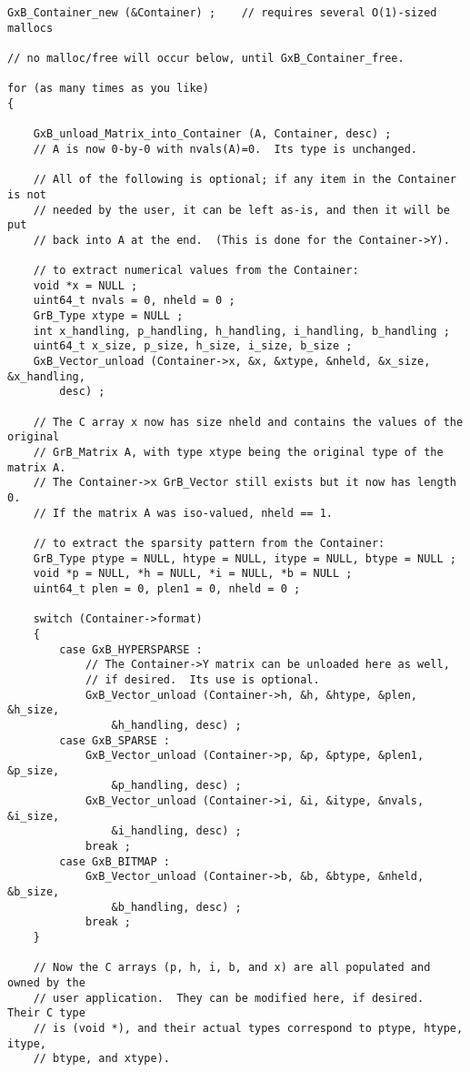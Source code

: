 {\footnotesize
\begin{verbatim}
GxB_Container_new (&Container) ;    // requires several O(1)-sized mallocs

// no malloc/free will occur below, until GxB_Container_free.

for (as many times as you like)
{

    GxB_unload_Matrix_into_Container (A, Container, desc) ;
    // A is now 0-by-0 with nvals(A)=0.  Its type is unchanged.

    // All of the following is optional; if any item in the Container is not
    // needed by the user, it can be left as-is, and then it will be put
    // back into A at the end.  (This is done for the Container->Y).

    // to extract numerical values from the Container:
    void *x = NULL ;
    uint64_t nvals = 0, nheld = 0 ;
    GrB_Type xtype = NULL ;
    int x_handling, p_handling, h_handling, i_handling, b_handling ;
    uint64_t x_size, p_size, h_size, i_size, b_size ;
    GxB_Vector_unload (Container->x, &x, &xtype, &nheld, &x_size, &x_handling,
        desc) ;

    // The C array x now has size nheld and contains the values of the original
    // GrB_Matrix A, with type xtype being the original type of the matrix A.
    // The Container->x GrB_Vector still exists but it now has length 0.
    // If the matrix A was iso-valued, nheld == 1.

    // to extract the sparsity pattern from the Container:
    GrB_Type ptype = NULL, htype = NULL, itype = NULL, btype = NULL ;
    void *p = NULL, *h = NULL, *i = NULL, *b = NULL ;
    uint64_t plen = 0, plen1 = 0, nheld = 0 ;

    switch (Container->format)
    {
        case GxB_HYPERSPARSE :
            // The Container->Y matrix can be unloaded here as well,
            // if desired.  Its use is optional.
            GxB_Vector_unload (Container->h, &h, &htype, &plen, &h_size,
                &h_handling, desc) ;
        case GxB_SPARSE :
            GxB_Vector_unload (Container->p, &p, &ptype, &plen1, &p_size,
                &p_handling, desc) ;
            GxB_Vector_unload (Container->i, &i, &itype, &nvals, &i_size,
                &i_handling, desc) ;
            break ;
        case GxB_BITMAP :
            GxB_Vector_unload (Container->b, &b, &btype, &nheld, &b_size,
                &b_handling, desc) ;
            break ;
    }

    // Now the C arrays (p, h, i, b, and x) are all populated and owned by the
    // user application.  They can be modified here, if desired.  Their C type
    // is (void *), and their actual types correspond to ptype, htype, itype,
    // btype, and xtype).


\end{verbatim}}
